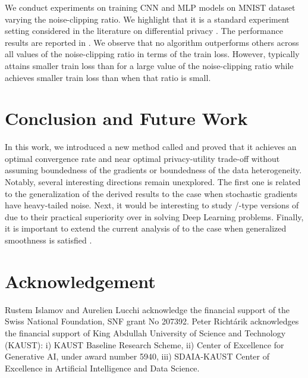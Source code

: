 \documentclass[a4paper,11pt]{article}
\begin{document}
We conduct experiments on training CNN and MLP models on MNIST dataset \citep{deng2012mnist} varying the noise-clipping ratio. We highlight that it is a standard experiment setting considered in the literature on differential privacy \citep{papernot2020making,li2023convergence,allouah2024privacy}. The performance results are reported in . We observe that no algorithm outperforms others across all values of the noise-clipping ratio in terms of the train loss. However,  typically attains smaller train loss than  for a large value of the noise-clipping ratio while  achieves smaller train loss than  when that ratio is small.



\section{Conclusion and Future Work}

In this work, we introduced a new method called  and proved that it achieves an optimal convergence rate and near optimal privacy-utility trade-off without assuming boundedness of the gradients or boundedness of the data heterogeneity. Notably, several interesting directions remain unexplored. The first one is related to the generalization of the derived results to the case when stochastic gradients have heavy-tailed noise. Next, it would be interesting to study /-type \citep{streeter2010less, duchi2011adaptive, kingma2014adam} versions of  due to their practical superiority over  in solving Deep Learning problems. Finally, it is important to extend the current analysis of  to the case when generalized smoothness is satisfied \citep{zhang2020why}.



\section*{Acknowledgement}

Rustem Islamov and Aurelien Lucchi acknowledge the financial support of the Swiss National Foundation, SNF grant No 207392. Peter Richt{\'a}rik acknowledges the financial support of King Abdullah University of Science and Technology (KAUST): i) KAUST Baseline Research Scheme, ii) Center of Excellence for Generative AI, under award number 5940, iii) SDAIA-KAUST Center of Excellence in Artificial Intelligence and Data Science.
\end{document}
